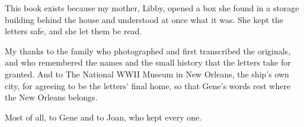 
\cleardoublepage
\thispagestyle{laplain}
\vspace*{0.10\textheight}
\begin{center}
    \par
    \vspace{0.4em}
    \brassrule[36pt]\par
\end{center}
\vspace{2em}

\noindent
This book exists because my mother, Libby, opened a box she found in a
storage building behind the house and understood at once what it was. She
kept the letters safe, and she let them be read.

\par
My thanks to the family who photographed and first transcribed the originals,
and who remembered the names and the small history that the letters take for
granted. And to The National WWII Museum in New Orleans, the ship's own city,
for agreeing to be the letters' final home, so that Gene's words rest where the
New Orleans belongs.

\par
Most of all, to Gene and to Joan, who kept every one.
\vfill

